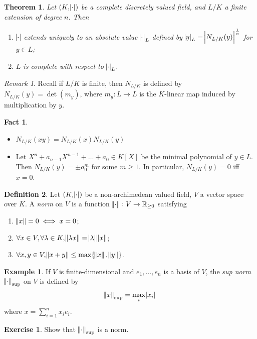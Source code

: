\documentclass[11pt]{article}
\theoremstyle{definition}
\newtheorem{definition}{Definition}[subsection]
\newtheorem*{example}{Example}
\newtheorem*{exercise}{Exercise}
\newtheorem*{fact}{Fact}
\theoremstyle{plain}
\newtheorem{theorem}[definition]{Theorem}
\theoremstyle{remark}
\newtheorem*{remark}{Remark}
\newcommand{\RR}{\mathbb{R}}
\begin{document}
\begin{theorem}\label{thm:6_1}
    Let $(K, \abs{\cdot})$ be a complete discretely valued field, and $L / K$ a finite extension of degree $n$. Then
    \begin{enumerate}
        \item $\abs{\cdot}$ extends uniquely to an absolute value $\abs{\cdot}_L$ defined by $\abs{y}_L = \abs{N_{L/K}(y)}^\frac{1}{n}$ for $y \in L$;
        \item $L$ is complete with respect to $\abs{\cdot}_L$.
    \end{enumerate}
\end{theorem}

\begin{remark}
    Recall if $L / K$ is finite, then $N_{L/K}$ is defined by $N_{L/K}(y) = \det (m_y)$, where $m_y : L \to L$ is the $K$-linear map induced by multiplication by $y$.
\end{remark}

\begin{fact}\phantom{}
    \begin{itemize}
        \item $N_{L/K}(xy) = N_{L/K}(x) N_{L/K}(y)$
        \item Let $X^n + a_{n-1}X^{n-1} + \ldots + a_0 \in K[X]$ be the minimal polynomial of $y \in L$. Then $N_{L/K}(y) = \pm a_0^m$ for some $m \ge 1$. In particular, $N_{L/K}(y) = 0$ iff $x = 0$.
    \end{itemize}
\end{fact}

\begin{definition}\label{def:6_2}
    Let $(K, \abs{\cdot})$ be a non-archimedean valued field, $V$ a vector space over $K$. A \emph{norm} on $V$ is a function $\norm{\cdot} : V \to \RR_{\ge 0}$ satisfying
    \begin{enumerate}
        \item $\norm{x} = 0 \iff x = 0$;
        \item $\forall x \in V, \forall \lambda \in K, \norm{\lambda x} = \abs{\lambda} \norm{x}$;
        \item $\forall x, y \in V, \norm{x + y} \le \max\{\norm{x}, \norm{y}\}$.
    \end{enumerate}
\end{definition}

\begin{example}
    If $V$ is finite-dimensional and $e_1, \ldots, e_n$ is a basis of $V$, the \emph{sup norm} $\norm{\cdot}_\mathrm{sup}$ on $V$ is defined by
    \begin{equation*}
        \norm{x}_\mathrm{sup} = \max_i \abs{x_i}
    \end{equation*}
    where $x = \sum_{i=1}^n x_i e_i$.
\end{example}
\begin{exercise}
    Show that $\norm{\cdot}_\mathrm{sup}$ is a norm.
\end{exercise}
\end{document}
